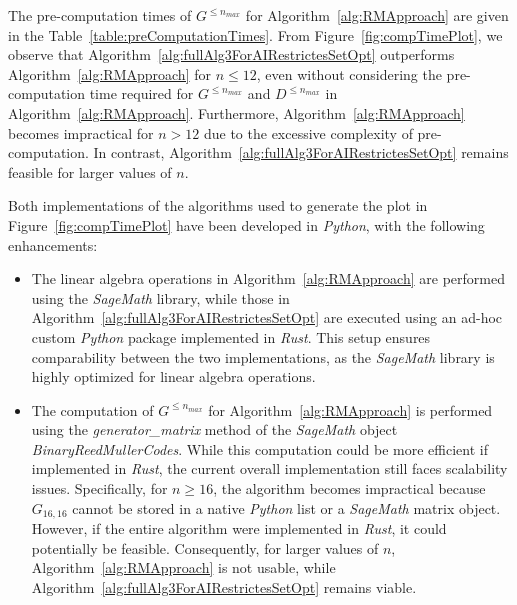 \documentclass[11pt]{llncs}
\begin{document}
The pre-computation times of $G^{\leq n_{max}}$ for Algorithm~\ref{alg:RMApproach} are given in the Table~\ref{table:preComputationTimes}. From Figure~\ref{fig:compTimePlot}, we observe that Algorithm~\ref{alg:fullAlg3ForAIRestrictesSetOpt} outperforms Algorithm~\ref{alg:RMApproach} for $n \leq 12$, even without considering the pre-computation time required for $G^{\leq n_{max}}$ and $D^{\leq n_{max}}$ in Algorithm~\ref{alg:RMApproach}. Furthermore, Algorithm~\ref{alg:RMApproach} becomes impractical for $n > 12$ due to the excessive complexity of pre-computation. In contrast, Algorithm~\ref{alg:fullAlg3ForAIRestrictesSetOpt} remains feasible for larger values of $n$. 

\begin{table}[H]
\centering
{}
\caption{Pre-computation time (in seconds) for $G^{\leq n_{max}}$ for $n_{max}$ from $1$ to $12$.}\label{table:preComputationTimes}
\end{table}

Both implementations of the algorithms used to generate the plot in Figure~\ref{fig:compTimePlot} have been developed in \textit{Python}, with the following enhancements:
\begin{itemize}
\item The linear algebra operations in Algorithm~\ref{alg:RMApproach} are performed using the \textit{SageMath} library, while those in Algorithm~\ref{alg:fullAlg3ForAIRestrictesSetOpt} are executed using an ad-hoc custom \textit{Python} package implemented in \textit{Rust}. This setup ensures comparability between the two implementations, as the \textit{SageMath} library is highly optimized for linear algebra operations.
\item The computation of $G^{\leq n_{max}}$ for Algorithm~\ref{alg:RMApproach} is performed using the \textit{generator\_matrix} method of the \textit{SageMath} object \textit{BinaryReedMullerCodes}. While this computation could be more efficient if implemented in \textit{Rust}, the current overall implementation still faces scalability issues. Specifically, for $n \geq 16$, the algorithm becomes impractical because $G_{16,16}$ cannot be stored in a native \textit{Python} list or a \textit{SageMath} matrix object. However, if the entire algorithm were implemented in \textit{Rust}, it could potentially be feasible. Consequently, for larger values of $n$, Algorithm~\ref{alg:RMApproach} is not usable, while Algorithm~\ref{alg:fullAlg3ForAIRestrictesSetOpt} remains viable.
\end{itemize}
\end{document}
